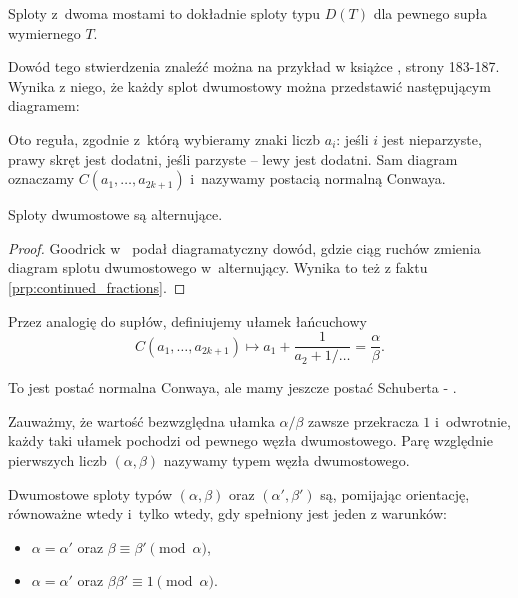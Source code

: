 \begin{proposition}
    Sploty z~dwoma mostami to dokładnie sploty typu $D(T)$ dla pewnego supła wymiernego $T$.
\end{proposition}

Dowód tego stwierdzenia znaleźć można na przykład w książce \cite{murasugi96}, strony 183-187.
Wynika z niego, że każdy splot dwumostowy można przedstawić następującym diagramem:


Oto reguła, zgodnie z~którą wybieramy znaki liczb $a_i$:
jeśli $i$ jest nieparzyste, prawy skręt jest dodatni, jeśli parzyste -- lewy jest dodatni.
Sam diagram oznaczamy $C(a_1, \ldots, a_{2k+1})$ i~nazywamy postacią normalną Conwaya.

\begin{proposition}
    Sploty dwumostowe są alternujące.
\end{proposition}

\begin{proof}
    Goodrick w~\cite{goodrick72} podał diagramatyczny dowód, gdzie ciąg ruchów zmienia diagram splotu dwumostowego w~alternujący.
    Wynika to też z faktu \ref{prp:continued_fractions}.
\end{proof}

Przez analogię do supłów, definiujemy ułamek łańcuchowy
\begin{equation}
    C(a_1, \ldots, a_{2k+1}) \mapsto a_1 + \frac{1}{a_2 + 1/\ldots} = \frac \alpha \beta.
\end{equation}

\begin{tobedone}
    To jest postać normalna Conwaya, ale mamy jeszcze postać Schuberta - \cite[s. 21]{kawauchi96}.
\end{tobedone}

Zauważmy, że wartość bezwzględna ułamka $\alpha/\beta$ zawsze przekracza $1$ i~odwrotnie, każdy taki ułamek pochodzi od pewnego węzła dwumostowego.
Parę względnie pierwszych liczb $(\alpha, \beta)$ nazywamy typem węzła dwumostowego.

\begin{proposition}
    \label{prp:tangle_equivalence}
    Dwumostowe sploty typów $(\alpha, \beta)$ oraz $(\alpha', \beta')$ są, pomijając orientację, równoważne wtedy i~tylko wtedy, gdy spełniony jest jeden z warunków:
    \begin{itemize}
        \item $\alpha = \alpha'$ oraz $\beta \equiv \beta' \pmod \alpha$,
        \item $\alpha = \alpha'$ oraz $\beta \beta' \equiv 1 \pmod \alpha$.
    \end{itemize}
\end{proposition}

